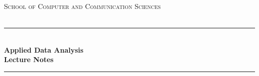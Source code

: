
\begin{titlepage} %
\begin{center}
\newcommand{\HRule}{\rule{\linewidth}{0.5mm}} %
\center %
 
 




\begin{figure} [h] %
\centerline{
} 
\end{figure}


\vspace{0.5cm}
\textsc{\Large School of Computer and Communication Sciences}\\[0.5cm] %
\textsc{\Large }\\%


\HRule \\[0.4cm]
{ \huge \bfseries Applied Data Analysis}\\[0.4cm] %

{ \huge \bfseries Lecture Notes}\\ %
\HRule \\[1.5cm]


\end{center}
\end{titlepage}
